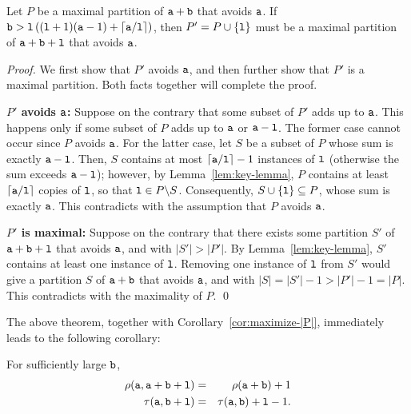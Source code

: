 \begin{theorem} \label{thm:OFS-of-P+L}
Let $P$ be a maximal partition of $\mathtt{a} + \mathtt{b}$ that avoids $\mathtt{a}$.
If $\mathtt{b} > \mathtt{l}\left((\mathtt{l}+1)(\mathtt{a} - 1) + \left \lceil \mathtt{a}/\mathtt{l} \right \rceil\right)$, then
$P' = P \cup \{ \mathtt{l} \}$ must be a maximal partition of $\mathtt{a} + \mathtt{b} + \mathtt{l}$ that avoids $\mathtt{a}$.
\end{theorem}
\begin{proof}
We first show that $P'$ avoids $\mathtt{a}$, and then further show that $P'$ is a maximal partition.
Both facts together will complete the proof.

\medskip

\noindent
{\bf $P'$ avoids $\mathtt{a}$:}  Suppose on the contrary that some subset of $P'$ adds up to $\mathtt{a}$.  This happens only if some subset of $P$
adds up to $\mathtt{a}$ or $\mathtt{a} - \mathtt{l}$.  The former case cannot occur since $P$ avoids $\mathtt{a}$.  For the latter case, let $S$ be a subset of $P$ 
whose sum is exactly $\mathtt{a} - \mathtt{l}$.  Then, $S$ contains at most $\left \lceil \mathtt{a}/\mathtt{l} \right \rceil - 1$ instances of $\mathtt{l}$ (otherwise the sum exceeds $\mathtt{a} - \mathtt{l}$);  
however, by Lemma~\ref{lem:key-lemma}, $P$ contains at least $\left \lceil \mathtt{a}/\mathtt{l} \right \rceil$ copies of $\mathtt{l}$, so that $\mathtt{l} \in P\backslash S$.
Consequently, $S \cup \{\mathtt{l}\} \subseteq P$, whose sum is exactly $\mathtt{a}$.  This contradicts with the assumption that $P$ avoids $\mathtt{a}$.

\medskip

\noindent
{\bf $P'$ is maximal:}  Suppose on the contrary that there exists some partition $S'$ of $\mathtt{a}+\mathtt{b}+\mathtt{l}$ that avoids $\mathtt{a}$, and with $|S'| > |P'|$.
By Lemma~\ref{lem:key-lemma}, $S'$ contains at least one instance of $\mathtt{l}$.  Removing one instance of $\mathtt{l}$ from $S'$ would give a 
partition $S$ of $\mathtt{a} + \mathtt{b}$ that avoids $\mathtt{a}$, and with $|S| = |S'| - 1 > |P'| - 1 = |P|$.  This contradicts with the maximality of $P$.
\qed
\end{proof}

The above theorem, together with Corollary~\ref{cor:maximize-|P|}, immediately leads to the following corollary:

\begin{corollary}
For sufficiently large $\mathtt{b}$,  
\begin{eqnarray*}
  \rho(\mathtt{a}, \mathtt{a} + \mathtt{b} + \mathtt{l}) &=& \rho(\mathtt{a} + \mathtt{b}) + 1 \\
  \tau(\mathtt{a},\mathtt{b}+\mathtt{l})             &=& \tau(\mathtt{a},\mathtt{b}) + \mathtt{l} - 1.
\end{eqnarray*}
\end{corollary}


